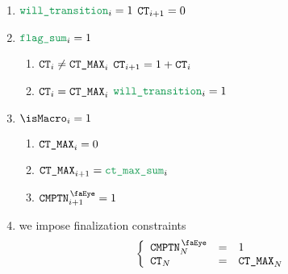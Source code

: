 \begin{enumerate}[resume]
	\item \If $\locTransitionSum _{i} = 1$ \Then $\texttt{CT} _{i  + 1} = 0$
	\item \If $\locFlagSum _{i} = 1$ \Then
		\begin{enumerate}
			\item \If $\texttt{CT} _{i} \neq \texttt{CT\_MAX} _{i}$ \Then $\texttt{CT} _{i + 1} = 1 + \texttt{CT} _{i}$
			\item \If $\texttt{CT} _{i} =    \texttt{CT\_MAX} _{i}$ \Then $\locTransitionSum _{i} = 1$
		\end{enumerate}
	\item \If $\isMacro _{i} = 1$ \Then
		\begin{enumerate}
			\item $\texttt{CT\_MAX}         _{i} = 0$
			\item $\maxCt         _{i  + 1} = \locCtMaxSum _{i}$
			\item $\isComputation _{i + 1} = 1$
		\end{enumerate}
	\item we impose finalization constraints
		\[
			\left\{ \begin{array}{lcl}
				\isComputation _{N} & = & 1           \\
				\ct _{N}            & = & \maxCt _{N} \\
			\end{array} \right.
		\]
\end{enumerate}
